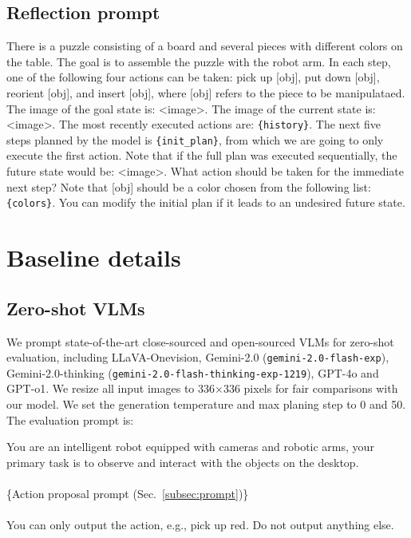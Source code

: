\subsection{Reflection prompt}

\begin{tcolorbox}[width=\textwidth, colback=gray!10, colframe=black, boxrule=0.8pt]
There is a puzzle consisting of a board and several pieces with different colors on the table. The goal is to assemble the puzzle with the robot arm. In each step, one of the following four actions can be taken: pick up [obj], put down [obj], reorient [obj], and insert [obj], where [obj] refers to the piece to be manipulataed. The image of the goal state is: \textless image\textgreater. The image of the current state is: \textless image\textgreater. The most recently executed actions are: {\tt\{history\}}. The next five steps planned by the model is {\tt\{init\_plan\}}, from which we are going to only execute the first action. Note that if the full plan was executed sequentially, the future state would be: \textless image\textgreater. What action should be taken for the immediate next step? Note that [obj] should be a color chosen from the following list: {\tt\{colors\}}. You can modify the initial plan if it leads to an undesired future state.
\end{tcolorbox}
      


\section{Baseline details}\label{sec:app_baseline_details}
\subsection{Zero-shot VLMs}
We prompt state-of-the-art close-sourced and open-sourced VLMs for zero-shot evaluation, including LLaVA-Onevision, Gemini-2.0 (\texttt{gemini-2.0-flash-exp}), Gemini-2.0-thinking (\texttt{gemini-2.0-flash-thinking-exp-1219}), GPT-4o and GPT-o1. We resize all input images to 336$\times$336 pixels for fair comparisons with our model. We set the generation temperature and max planing step to 0 and 50. The evaluation prompt is:
\begin{tcolorbox}[width=\textwidth, colback=gray!10, colframe=black, boxrule=0.8pt]
You are an intelligent robot equipped with cameras and robotic arms, your primary task is to observe and interact with the objects on the desktop.
\\
\\
\{Action proposal prompt (Sec.~\ref{subsec:prompt})\}
\\
\\
You can only output the action, e.g., pick up red. Do not output anything else.
\end{tcolorbox}

